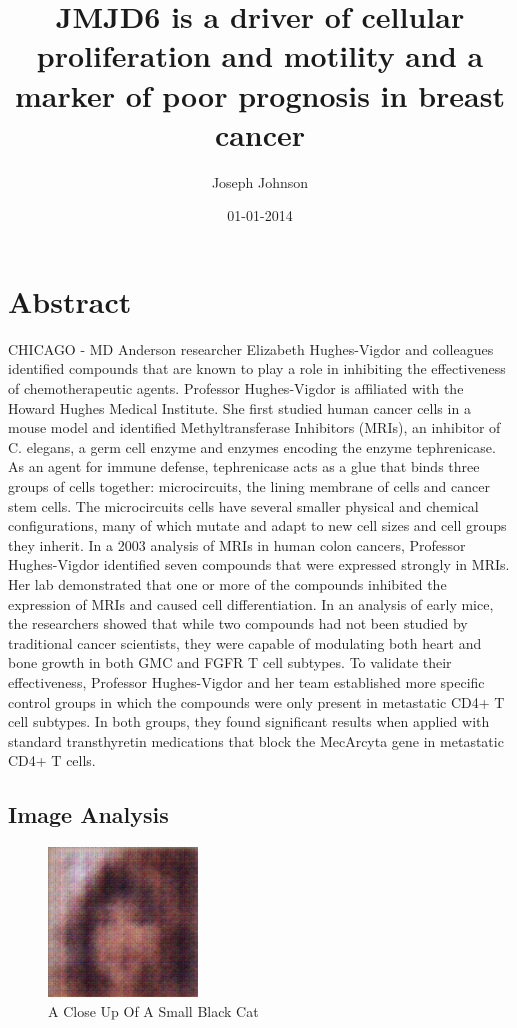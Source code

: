 \documentclass{article}%
\title{JMJD6 is a driver of cellular proliferation and motility and a marker of poor prognosis in breast cancer}%
\author{Joseph Johnson}%
\affil{CENAR and Department of Molecular Medicine, Faculty of Medicine, University of Malaya, Kuala Lumpur, Malaysia}%
\date{01{-}01{-}2014}%
\begin{document}
%
\normalsize%
\maketitle%
\section{Abstract}%
\label{sec:Abstract}%
CHICAGO {-} MD Anderson researcher Elizabeth Hughes{-}Vigdor and colleagues identified compounds that are known to play a role in inhibiting the effectiveness of chemotherapeutic agents.\newline%
Professor Hughes{-}Vigdor is affiliated with the Howard Hughes Medical Institute. She first studied human cancer cells in a mouse model and identified Methyltransferase Inhibitors (MRIs), an inhibitor of C. elegans, a germ cell enzyme and enzymes encoding the enzyme tephrenicase.\newline%
As an agent for immune defense, tephrenicase acts as a glue that binds three groups of cells together: microcircuits, the lining membrane of cells and cancer stem cells. The microcircuits cells have several smaller physical and chemical configurations, many of which mutate and adapt to new cell sizes and cell groups they inherit.\newline%
In a 2003 analysis of MRIs in human colon cancers, Professor Hughes{-}Vigdor identified seven compounds that were expressed strongly in MRIs. Her lab demonstrated that one or more of the compounds inhibited the expression of MRIs and caused cell differentiation.\newline%
In an analysis of early mice, the researchers showed that while two compounds had not been studied by traditional cancer scientists, they were capable of modulating both heart and bone growth in both GMC and FGFR T cell subtypes.\newline%
To validate their effectiveness, Professor Hughes{-}Vigdor and her team established more specific control groups in which the compounds were only present in metastatic CD4+ T cell subtypes. In both groups, they found significant results when applied with standard transthyretin medications that block the MecArcyta gene in metastatic CD4+ T cells.

%
\subsection{Image Analysis}%
\label{subsec:ImageAnalysis}%


\begin{figure}[h!]%
\centering%
\includegraphics[width=150px]{500_fake_images/samples_5_500.png}%
\caption{A Close Up Of A Small Black Cat}%
\end{figure}

%
\end{document}
